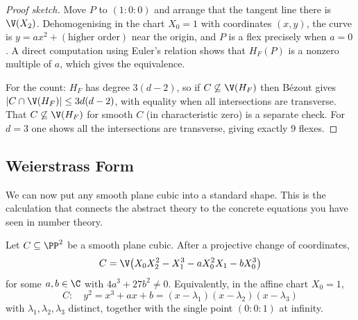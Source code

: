 \begin{proof}[Proof sketch]
	Move $P$ to $(1:0:0)$ and arrange that the tangent line there is $\V(X_2)$. Dehomogenising in the chart $X_0 = 1$ with coordinates $(x,y)$, the curve is $y = a x^2 + (\text{higher order})$ near the origin, and $P$ is a flex precisely when $a = 0$. A direct computation using Euler's relation shows that $H_F(P)$ is a nonzero multiple of $a$, which gives the equivalence.

	For the count: $H_F$ has degree $3(d-2)$, so if $C \not\subseteq \V(H_F)$ then B\'ezout gives $|C \cap \V(H_F)| \leq 3d(d-2)$, with equality when all intersections are transverse. That $C \not\subseteq \V(H_F)$ for smooth $C$ (in characteristic zero) is a separate check. For $d = 3$ one shows all the intersections are transverse, giving exactly $9$ flexes.
\end{proof}

\subsection{Weierstrass Form}

We can now put any smooth plane cubic into a standard shape. This is the calculation that connects the abstract theory to the concrete equations you have seen in number theory.

\begin{theorem}\label{ag-thm:weierstrass}
	Let $C \subseteq \PP^2$ be a smooth plane cubic. After a projective change of coordinates,
	$$C = \V\big(X_0X_2^2 - X_1^3 - aX_0^2X_1 - bX_0^3\big)$$
	for some $a,b \in \C$ with $4a^3 + 27b^2 \neq 0$. Equivalently, in the affine chart $X_0 = 1$,
	$$C \colon\quad y^2 = x^3 + ax + b = (x-\lambda_1)(x-\lambda_2)(x-\lambda_3)$$
	with $\lambda_1,\lambda_2,\lambda_3$ distinct, together with the single point $(0:0:1)$ at infinity.
\end{theorem}

